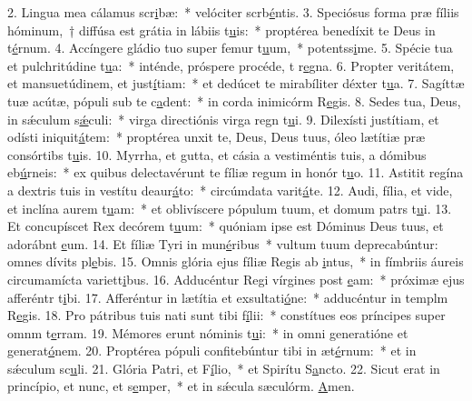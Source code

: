 2. Lingua mea cálamus scr\uline{i}bæ:~* velóciter scrb\uline{é}ntis.
3. Speciósus forma præ fíliis hóminum,~† diffúsa est grátia in lábiis t\uline{u}is:~* proptérea benedíxit te Deus in t\uline{é}rnum.
4. Accíngere gládio tuo super femur t\uline{u}um,~* potentss\uline{i}me.
5. Spécie tua et pulchritúdine t\uline{u}a:~* inténde, próspere procéde, t r\uline{e}gna.
6. Propter veritátem, et mansuetúdinem, et just\uline{í}tiam:~* et dedúcet te mirabíliter déxter t\uline{u}a.
7. Sagíttæ tuæ acútæ, pópuli sub te c\uline{a}dent:~* in corda inimicórm R\uline{e}gis.
8. Sedes tua, Deus, in sǽculum s\uline{ǽ}culi:~* virga directiónis virga regn t\uline{u}i.
9. Dilexísti justítiam, et odísti iniquit\uline{á}tem:~* proptérea unxit te, Deus, Deus tuus, óleo lætítiæ præ consórtibs t\uline{u}is.
10. Myrrha, et gutta, et cásia a vestiméntis tuis, a dómibus eb\uline{ú}rneis:~* ex quibus delectavérunt te fíliæ regum in honór t\uline{u}o.
11. Astitit regína a dextris tuis in vestítu deaur\uline{á}to:~* circúmdata varit\uline{á}te.
12. Audi, fília, et vide, et inclína aurem t\uline{u}am:~* et oblivíscere pópulum tuum, et domum patrs t\uline{u}i.
13. Et concupíscet Rex decórem t\uline{u}um:~* quóniam ipse est Dóminus Deus tuus, et adorábnt \uline{e}um.
14. Et fíliæ Tyri in mun\uline{é}ribus~* vultum tuum deprecabúntur: omnes dívits pl\uline{e}bis.
15. Omnis glória ejus fíliæ Regis ab \uline{i}ntus,~* in fímbriis áureis circumamícta variett\uline{i}bus.
16. Adducéntur Regi vírgines post \uline{e}am:~* próximæ ejus afferéntr t\uline{i}bi.
17. Afferéntur in lætítia et exsultati\uline{ó}ne:~* adducéntur in templm R\uline{e}gis.
18. Pro pátribus tuis nati sunt tibi f\uline{í}lii:~* constítues eos príncipes super omnm t\uline{e}rram.
19. Mémores erunt nóminis t\uline{u}i:~* in omni generatióne et generat\uline{ó}nem.
20. Proptérea pópuli confitebúntur tibi in æt\uline{é}rnum:~* et in sǽculum sc\uline{u}li.
21. Glória Patri, et F\uline{í}lio,~* et Spirítu S\uline{a}ncto.
22. Sicut erat in princípio, et nunc, et s\uline{e}mper,~* et in sǽcula sæculórm. \uline{A}men.
